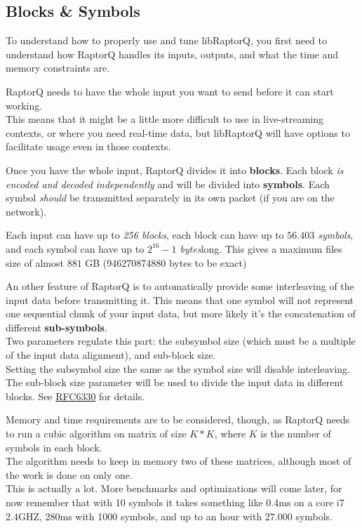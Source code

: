 \documentclass[11pt,a4paper]{refart}
\begin{document}
\subsection{Blocks \& Symbols}

To understand how to properly use and tune libRaptorQ, you first need to understand how RaptorQ handles its inputs, outputs, and what the time and memory
constraints are.

RaptorQ needs to have the whole input you want to send before it can start working.\\
This means that it might be a little more difficult to use in live-streaming contexts, or where you need real-time data, but libRaptorQ will have options to
facilitate usage even in those contexts.

Once you have the whole input, RaptorQ divides it into \textbf{blocks}. Each block \textit{is encoded and decoded independently} and will be divided into \textbf{symbols}. Each symbol \textit{should}
be transmitted separately in its own packet (if you are on the network).

Each input can have up to \textit{256 blocks}, each block can have up to \textit{$56.403$ symbols}, and each
symbol can have up to \textit{$2^{16}-1$ bytes}long. This gives a maximum files size of almost $881$ GB (946270874880 bytes to be exact)

An other feature of RaptorQ is to automatically provide some interleaving of the input data before transmitting it. This means that one symbol will not
represent one sequential chunk of your input data, but more likely it's the concatenation of different \textbf{sub-symbols}. \\
Two parameters regulate this part: the subsymbol size (which must be a multiple of the input data alignment), and sub-block size. \\Setting the subsymbol size the same as the symbol size will disable interleaving. \\ The sub-block size parameter will be used to divide the input data in different blocks. See \href{https://tools.ietf.org/html/rfc6330}{RFC6330} for details.


Memory and time requirements are to be considered, though, as RaptorQ needs to run a cubic algorithm on matrix of size $K*K$, where $K$ is the number of
symbols in each block.\\
The algorithm needs to keep in memory two of these matrices, although most of the work is done on only one.\\
This is actually a lot. More benchmarks and optimizations will come later, for now remember that with 10 symbols it takes something like 0.4ms on a core i7 2.4GHZ, 280ms with 1000 symbols, and up to an hour with 27.000 symbols.
\end{document}
